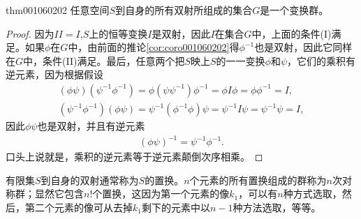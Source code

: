 \begin{theorem}{}{thm001060202}
任意空间$S$到自身的所有双射所组成的集合$G$是一个变换群。
\end{theorem}

\begin{proof}
因为$II=I$,$S$上的恒等变换$I$是双射，因此$I$在集合$G$中，上面的条件(I)满足。如果$\phi$在$G$中，由前面的推论\ref{cor:coro001060202}得$\phi^{-1}$也是双射，因此它同样在$G$中，条件(II)满足。最后，任意两个把$S$映上$S$的一一变换$\phi$和$\psi$，它们的乘积有逆元素，因为根据假设
\begin{gather*}
(\phi\psi)(\psi^{-1}\phi^{-1}) = \phi(\psi\psi^{-1})\phi^{-1} = \phi{}I\phi = \phi\phi^{-1} = I,\\
(\psi^{-1}\phi^{-1})(\phi\psi) = \psi^{-1}(\phi^{-1}\phi)\psi = \psi^{-1}I\psi = \psi^{-1}\psi = I,
\end{gather*}
因此$\phi\psi$也是双射，并且有逆元素
\begin{gather}\label{equ001060205}
(\phi\psi)^{-1} = \psi^{-1}\phi^{-1}.
\end{gather}
口头上说就是，乘积的逆元素等于逆元素颠倒次序相乘。
\end{proof}

有限集$S$到自身的双射通常称为$S$的置换。$n$个元素的所有置换组成的群称为$n$次对称群；显然它包含$n!$个置换，这因为第一个元素的像$k_1$，可以有$n$种方式选取，然后，第二个元素的像可从去掉$k_1$剩下的元素中以$n-1$种方法选取，等等。

